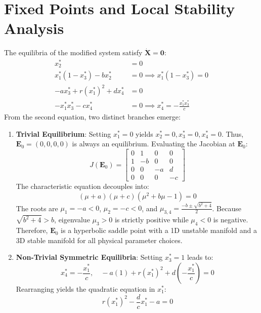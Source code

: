 \documentclass[12pt,a4paper,oneside]{report}
\begin{document}
\section{Fixed Points and Local Stability Analysis}
The equilibria of the modified system satisfy $\dot{\mathbf{X}} = \mathbf{0}$:
\begin{align}
    x_2^* &= 0 \\
    x_1^* (1 - x_3^*) - b x_2^* &= 0 \implies x_1^*(1 - x_3^*) = 0 \\
    -a x_3^* + r (x_1^*)^2 + d x_4^* &= 0 \\
    -x_1^* x_3^* - c x_4^* &= 0 \implies x_4^* = -\frac{x_1^* x_3^*}{c}
\end{align}
From the second equation, two distinct branches emerge:
\begin{enumerate}
    \item \textbf{Trivial Equilibrium}: Setting $x_1^* = 0$ yields $x_2^* = 0, x_3^* = 0, x_4^* = 0$. Thus, $\mathbf{E}_0 = (0, 0, 0, 0)$ is always an equilibrium. Evaluating the Jacobian at $\mathbf{E}_0$:
    \begin{equation}
        J(\mathbf{E}_0) = \begin{bmatrix}
        0 & 1 & 0 & 0 \\
        1 & -b & 0 & 0 \\
        0 & 0 & -a & d \\
        0 & 0 & 0 & -c
        \end{bmatrix}
    \end{equation}
    The characteristic equation decouples into:
    \begin{equation}
        (\mu + a)(\mu + c)(\mu^2 + b\mu - 1) = 0
    \end{equation}
    The roots are $\mu_1 = -a < 0$, $\mu_2 = -c < 0$, and $\mu_{3,4} = \frac{-b \pm \sqrt{b^2 + 4}}{2}$. Because $\sqrt{b^2 + 4} > b$, eigenvalue $\mu_3 > 0$ is strictly positive while $\mu_4 < 0$ is negative. Therefore, $\mathbf{E}_0$ is a hyperbolic saddle point with a 1D unstable manifold and a 3D stable manifold for all physical parameter choices.
    \item \textbf{Non-Trivial Symmetric Equilibria}: Setting $x_3^* = 1$ leads to:
    \begin{equation}
        x_4^* = -\frac{x_1^*}{c}, \quad -a(1) + r(x_1^*)^2 + d\left(-\frac{x_1^*}{c}\right) = 0
    \end{equation}
    Rearranging yields the quadratic equation in $x_1^*$:
    \begin{equation}
        r (x_1^*)^2 - \frac{d}{c} x_1^* - a = 0

\end{equation}
\end{enumerate}
\end{document}
